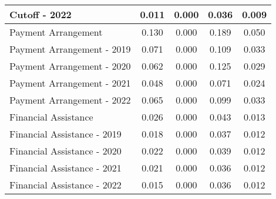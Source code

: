 \begin{tabular}{l|c|c|c|c}
\quad Cutoff - 2022 & 0.011 & 0.000 & 0.036 & 0.009 \\
\midrule 
Payment Arrangement & 0.130 & 0.000 & 0.189 & 0.050 \\
\quad Payment Arrangement - 2019 & 0.071 & 0.000 & 0.109 & 0.033 \\
\quad Payment Arrangement - 2020 & 0.062 & 0.000 & 0.125 & 0.029 \\
\quad Payment Arrangement - 2021 & 0.048 & 0.000 & 0.071 & 0.024 \\
\quad Payment Arrangement - 2022 & 0.065 & 0.000 & 0.099 & 0.033 \\
\midrule 
Financial Assistance & 0.026 & 0.000 & 0.043 & 0.013 \\
\quad Financial Assistance - 2019 & 0.018 & 0.000 & 0.037 & 0.012 \\
\quad Financial Assistance - 2020 & 0.022 & 0.000 & 0.039 & 0.012 \\
\quad Financial Assistance - 2021 & 0.021 & 0.000 & 0.036 & 0.012 \\
\quad Financial Assistance - 2022 & 0.015 & 0.000 & 0.036 & 0.012 \\
\midrule 
\bottomrule 
\end{tabular}
